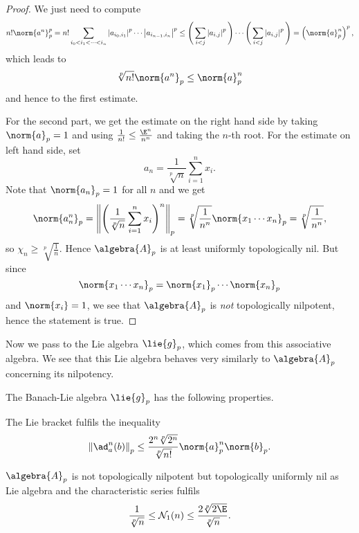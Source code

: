 \documentclass[
11pt,                          %
english                        %
]{article}
\begin{document}
\begin{proof}
	We just need to compute
	\begin{equation*}
		n! \norm{a^n}_p^p
		=
		n! \sum\limits_{i_0 < i_1 < \cdots < i_n}
		\left|
			a_{i_0, i_1}
		\right|^p
			\cdots
		\left|
			a_{i_{n-1}, i_n}
		\right|^p
		\leq
		\Bigg(
			\sum\limits_{i < j}
			\left|
				a_{i,j}
			\right|^p
		\Bigg)
		\cdots
		\Bigg(
			\sum\limits_{i < j}
			\left|
				a_{i,j}
			\right|^p
		\Bigg)
		=
		\left(
			\norm{a}_p^n
		\right)^p,
	\end{equation*}
	which leads to 
	\begin{equation*}
		\sqrt[p]{n!} \norm{a^n}_p
		\leq
		\norm{a}_p^n
	\end{equation*}
	and hence to the first estimate.
	
	For the second part, we get the estimate on the right hand side by taking 
	$\norm{a}_p = 1$ and using $\frac{1}{n!} \leq \frac{\E^n}{n^n}$ and taking the 
	$n$-th root. For the estimate on left hand side, set
	\begin{equation*}
		a_n 
		=
		\frac{1}{\sqrt[p]{n}}
		\sum\limits_{i=1}^n
		x_i.
	\end{equation*}
	Note that $\norm{a_n}_p = 1$ for all $n$ and we get
	\begin{equation*}
		\norm{a_n^n}_p
		=
		\left\Vert
			\left(
				\frac{1}{\sqrt[p]{n}}
				\sum\limits_{i=1}^n
				x_i
			\right)^n
		\right\Vert_p
		=
		\sqrt[p]{\frac{1}{n^n}}
		\norm{x_1 \cdots x_n}_p
		=
		\sqrt[p]{\frac{1}{n^n}},
	\end{equation*}
	so $\chi_n \geq \sqrt[p]{\frac{1}{n}}$.
	Hence $\algebra{A}_p$ is at least uniformly topologically nil. But since
	\begin{equation*}
		\norm{x_1 \cdots x_n}_p
		=
		\norm{x_1}_p \cdots \norm{x_n}_p
	\end{equation*}
	and $\norm{x_i} = 1$, we see that $\algebra{A}_p$ is 
	\emph{not} topologically nilpotent, hence the statement is true.
\end{proof}
Now we pass to the Lie algebra $\lie{g}_p$, which comes from this 
associative algebra. We see that this Lie algebra behaves very similarly to 
$\algebra{A}_p$ concerning its nilpotency.
\begin{lemma}
	The Banach-Lie algebra $\lie{g}_p$ has the following properties.
	\begin{lemmalist}
		\item
		The Lie bracket fulfils the inequality
		\begin{equation}
			\label{eq:lemma:Ex1LiePowers}
			\left\Vert
				\ad_a^n (b)
			\right\Vert_p
			\leq
			\frac{2^n \sqrt[p]{2^n}}{\sqrt[p]{n!}}
			\norm{a}_p^n \norm{b}_p.
		\end{equation}
		
		\item
		$\algebra{A}_p$ is not topologically nilpotent but topologically uniformly 
		nil as Lie algebra and the characteristic series fulfils
		\begin{equation}
			\label{eq:lemma:Ex1LieSequence}
			\frac{1}{\sqrt[p]{n}} 
			\leq 
			\mathcal{N}_1(n)
			\leq 
			\frac{2 \sqrt[p]{2 \E}}{\sqrt[p]{n}}.
		\end{equation}	
	\end{lemmalist}
\end{lemma}
\end{document}
